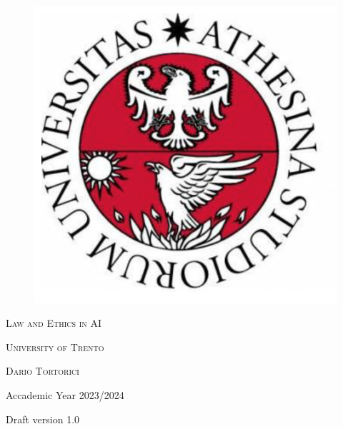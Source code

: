 \pagestyle{plain}

\thispagestyle{empty}

\begin{center}
   \begin{figure}
       \centering
       \includegraphics[width=0.5\linewidth]{Assets/UniTnLogo.png}
       \label{fig:enter-label}
   \end{figure}

  \vspace{2 cm} 

  \Huge\textsc{Law and Ethics in AI\\}
  \vspace{2 cm} 
  
  \Large\textsc{University of Trento\\}
  
  \vspace{2 cm} 
  \Large\textsc{Dario Tortorici\\}

  \vspace{2 cm} 
  \Large{Accademic Year 2023/2024}
  
  \vspace{1 cm}
  \small{Draft version 1.0}
  
\end{center}


